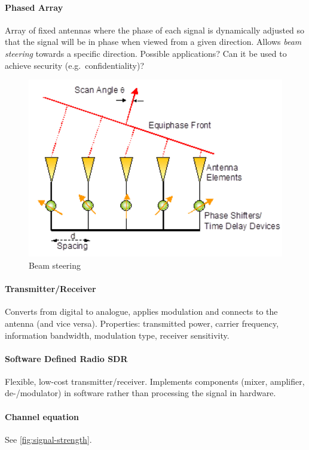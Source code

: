 \paragraph{Phased Array}
Array of fixed antennas where the phase of each signal is dynamically adjusted
so that the signal will be in phase when viewed from a given direction. Allows
\textit{beam steering} towards a specific direction. Possible applications? Can
it be used to achieve security (e.g.\ confidentiality)?

\begin{figure}[h]
	\centering
	\includegraphics[scale=0.4]{images/1-beam-steering.png}
	\caption{Beam steering}%
	\label{fig:beam-steering}
\end{figure}

\paragraph{Transmitter/Receiver}
Converts from digital to analogue, applies modulation and connects to the
antenna (and vice versa). Properties: transmitted power, carrier frequency,
information bandwidth, modulation type, receiver sensitivity.

\paragraph{Software Defined Radio SDR}
Flexible, low-cost transmitter/receiver. Implements components (mixer,
amplifier, de-/modulator) in software rather than processing the signal in
hardware.

\paragraph{Channel equation}
See \autoref{fig:signal-strength}.

